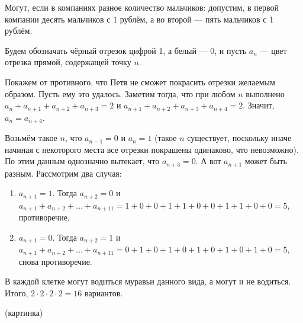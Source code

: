 \begin{itemize}
\itA Могут, если в компаниях разное количество мальчиков: допустим, в первой компании десять мальчиков с 1 рублём, а во второй --- пять мальчиков с 1 рублём.

\itB 

Будем обозначать чёрный отрезок цифрой 1, а белый --- 0, и пусть $a_n$ --- цвет отрезка прямой, содержащей
точку $n$.

Покажем от противного, что Петя не сможет покрасить отрезки желаемым образом.
Пусть ему это удалось.
Заметим тогда, что при любом $n$ выполнено 
$a_n+a_{n+1}+a_{n+2}+a_{n+3} = 2$ и $a_{n+1}+a_{n+2}+a_{n+3}+a_{n+4} = 2$. 
Значит, $a_n = a_{n+4}$. 

Возьмём такое $n$, что $a_{n-1} = 0$ и $a_n = 1$ (такое $n$ существует, поскольку иначе
начиная с некоторого места все отрезки покрашены одинаково, что невозможно). 
По этим данным однозначно вытекает, что $a_{n+3} = 0$. А вот $a_{n+1}$ может быть
разным.
Рассмотрим два случая: 

\begin{enumerate}
\item $a_{n+1} = 1$. Тогда $a_{n+2} = 0$ и
$a_{n+1} + a_{n+2} + \dots + a_{n+11} = 1 + 0 + 0 + 1 + 1 + 0 + 0 + 1 + 1 + 0 + 0 = 5$,
противоречие.

\item $a_{n+1} = 0$. Тогда $a_{n+2} = 1$ и
$a_{n+1} + a_{n+2} + \dots + a_{n+11} = 0 + 1 + 0 + 1 + 0 + 1 + 0 + 1 + 0 + 1 + 0 = 5$,
снова противоречие.
\end{enumerate}

\itC В каждой клетке могут водиться муравьи данного вида, а могут и не водиться. 
Итого, $2 \cdot 2 \cdot 2 \cdot 2 = 16$ вариантов. 

(картинка)
\end{itemize}
